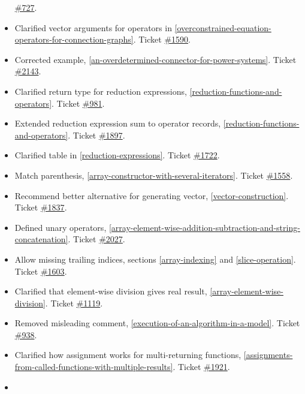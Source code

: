 \documentclass[../MLS.tex]{subfiles}
\begin{document}
\begin{itemize}
  \href{https://trac.modelica.org/Modelica/ticket/727}{\#727}.
\item
  Clarified vector arguments for operators in \autoref{overconstrained-equation-operators-for-connection-graphs}. Ticket
  \href{https://trac.modelica.org/Modelica/ticket/1590}{\#1590}.
\item
  Corrected example, \autoref{an-overdetermined-connector-for-power-systems}. Ticket
  \href{https://trac.modelica.org/Modelica/ticket/2143}{\#2143}.
\item
  Clarified return type for reduction expressions, \autoref{reduction-functions-and-operators}.
  Ticket \href{https://trac.modelica.org/Modelica/ticket/981}{\#981}.
\item
  Extended reduction expression sum to operator records, \autoref{reduction-functions-and-operators}.
  Ticket \href{https://trac.modelica.org/Modelica/ticket/1897}{\#1897}.
\item
  Clarified table in \autoref{reduction-expressions}. Ticket
  \href{https://trac.modelica.org/Modelica/ticket/1722}{\#1722}.
\item
  Match parenthesis, \autoref{array-constructor-with-several-iterators}. Ticket
  \href{https://trac.modelica.org/Modelica/ticket/1558}{\#1558}.
\item
  Recommend better alternative for generating vector, \autoref{vector-construction}.
  Ticket \href{https://trac.modelica.org/Modelica/ticket/1837}{\#1837}.
\item
  Defined unary operators, \autoref{array-element-wise-addition-subtraction-and-string-concatenation}. Ticket
  \href{https://trac.modelica.org/Modelica/ticket/2027}{\#2027}.
\item
  Allow missing trailing indices, sections \autoref{array-indexing} and \autoref{slice-operation}. Ticket
  \href{https://trac.modelica.org/Modelica/ticket/1603}{\#1603}.
\item
  Clarified that element-wise division gives real result, 
  \autoref{array-element-wise-division}. Ticket
  \href{https://trac.modelica.org/Modelica/ticket/1119}{\#1119}.
\item
  Removed misleading comment, \autoref{execution-of-an-algorithm-in-a-model}. Ticket
  \href{https://trac.modelica.org/Modelica/ticket/938}{\#938}.
\item
  Clarified how assignment works for multi-returning functions, 
  \autoref{assignments-from-called-functions-with-multiple-results}. Ticket
  \href{https://trac.modelica.org/Modelica/ticket/1921}{\#1921}.
\item

\end{itemize}
\end{document}
